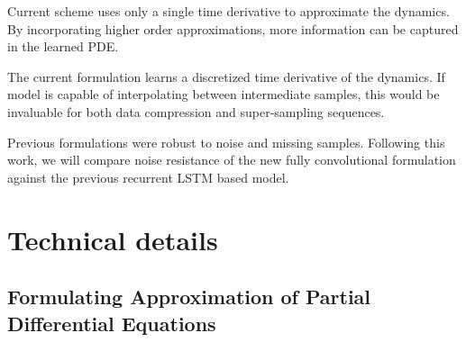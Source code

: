 \documentclass[12pt]{article}
\theoremstyle{plain}
\theoremstyle{remark}
\theoremstyle{definition}
\begin{document}
\noindent Current scheme uses only a single time derivative to approximate the dynamics. By incorporating higher order approximations, more information can be captured in the learned PDE.

\noindent The current formulation learns a discretized time derivative of the dynamics. If model is capable of interpolating between intermediate samples, this would be invaluable for both data compression and super-sampling sequences. 

\noindent Previous formulations were robust to noise and missing samples. Following this work, we will compare noise resistance of the new fully convolutional formulation against the previous recurrent LSTM based model.

\section{Technical details}

\subsection{Formulating Approximation of Partial Differential Equations}
\end{document}
